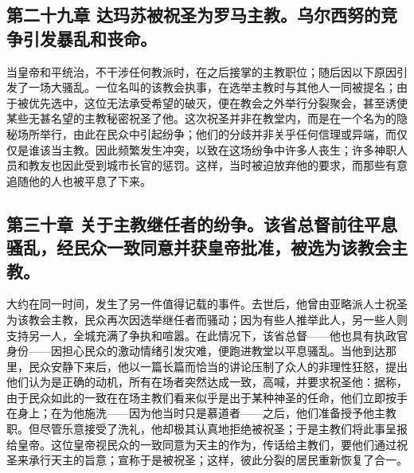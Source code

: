 \subsection{第二十九章 达玛苏被祝圣为罗马主教。乌尔西努的竞争引发暴乱和丧命。}

当皇帝和平统治，不干涉任何教派时，在之后接掌的主教职位；随后因以下原因引发了一场大骚乱。一位名叫的该教会执事，在选举主教时与其他人一同被提名；由于被优先选中，这位无法承受希望的破灭，便在教会之外举行分裂聚会，甚至诱使某些无甚名望的主教秘密祝圣了他。这次祝圣并非在教堂内，而是在一个名为的隐秘场所举行，由此在民众中引起纷争；他们的分歧并非关乎任何信理或异端，而仅仅是谁该当主教。因此频繁发生冲突，以致在这场纷争中许多人丧生；许多神职人员和教友也因此受到城市长官的惩罚。这样，当时被迫放弃他的要求，而那些有意追随他的人也被平息了下来。\par


\subsection{第三十章 关于主教继任者的纷争。该省总督前往平息骚乱，经民众一致同意并获皇帝批准，被选为该教会主教。}

大约在同一时间，发生了另一件值得记载的事件。去世后，他曾由亚略派人士祝圣为该教会主教，民众再次因选举继任者而骚动；因为有些人推举此人，另一些人则支持另一人，全城充满了争执和喧嚣。在此情况下，该省总督——他也具有执政官身份——因担心民众的激动情绪引发灾难，便跑进教堂以平息骚乱。当他到达那里，民众安静下来后，他以一篇长篇而恰当的讲论压制了众人的非理性狂怒，提出他们认为是正确的动机，所有在场者突然达成一致，高喊，并要求祝圣他：据称，由于民众如此的一致在在场主教们看来似乎是出于某种神圣的任命，他们立即按手在身上；在为他施洗——因为他当时只是慕道者——之后，他们准备授予他主教职。但尽管乐意接受了洗礼，他却极其认真地拒绝被祝圣；于是主教们将此事呈报给皇帝。这位皇帝视民众的一致同意为天主的作为，传话给主教们，要他们通过祝圣来承行天主的旨意；宣称于是被祝圣；这样，彼此分裂的居民重新恢复了合一。\par

